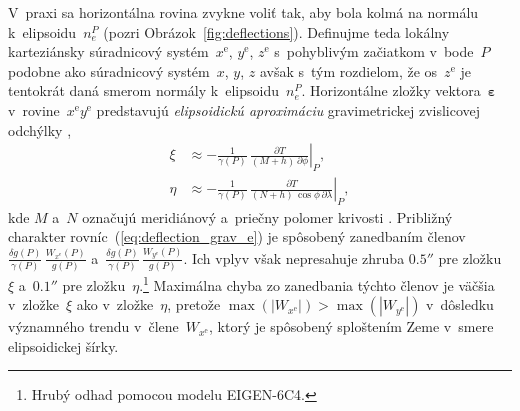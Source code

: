 \documentclass[a4paper, 12pt]{book}
\begin{document}
V~praxi sa horizontálna rovina zvykne voliť tak, aby bola kolmá na normálu 
k~elipsoidu~$n_e^P$ (pozri Obrázok~\ref{fig:deflections}).  Definujme teda 
lokálny karteziánsky súradnicový systém~$x^\mathrm{e}$, $y^\mathrm{e}$, 
$z^\mathrm{e}$ s~pohyblivým začiatkom v~bode~$P$ podobne ako súradnicový 
systém~$x$, $y$, $z$ avšak s~tým rozdielom, že os~$z^\mathrm{e}$ je tentokrát 
daná smerom normály k~elipsoidu~$n_e^P$.  Horizontálne zložky 
vektora~$\boldsymbol\varepsilon$ v~rovine~$x^\mathrm{e}y^\mathrm{e}$ 
predstavujú \emph{elipsoidickú aproximáciu} gravimetrickej zvislicovej odchýlky 
\parencite{Jekeli1999b},
%
\begin{equation}
\label{eq:deflection_grav_e}
\begin{split}
\xi &\approx -\frac{1}{\gamma(P)} \, \left.\frac{\partial T}{(M + h) \, 
\partial \phi}\right|_P{,}\\
%
\eta &\approx -\frac{1}{\gamma(P)} \, \left.\frac{\partial T}{(N + h) \, 
\cos\phi \, \partial \lambda}\right|_P{,}
\end{split}
\end{equation}
%
kde $M$ a~$N$ označujú meridiánový a~priečny polomer krivosti \parencite[pozri 
napríklad][]{MoritzPhysicalGeodesy}.  Približný charakter 
rovníc~(\ref{eq:deflection_grav_e}) je spôsobený zanedbaním 
členov~$\frac{\delta g(P)}{\gamma(P)} \, \frac{W_{x^\mathrm{e}}(P)}{g(P)}$ 
a~$\frac{\delta g(P)}{\gamma(P)} \, \frac{W_{y^\mathrm{e}}(P)}{g(P)}$.  Ich 
vplyv však nepresahuje zhruba $0.5''$ pre zložku~$\xi$ a~$0.1''$ pre 
zložku~$\eta$.\footnote{Hrubý odhad pomocou modelu EIGEN-6C4.}  Maximálna chyba 
zo zanedbania týchto členov je väčšia v~zložke~$\xi$ ako v~zložke~$\eta$, 
pretože $\max(|W_{x^\mathrm{e}}|) > \max(|W_{y^\mathrm{e}}|)$ v~dôsledku 
významného trendu v~člene~$W_{x^\mathrm{e}}$, ktorý je spôsobený sploštením 
Zeme v~smere elipsoidickej šírky.
\end{document}
